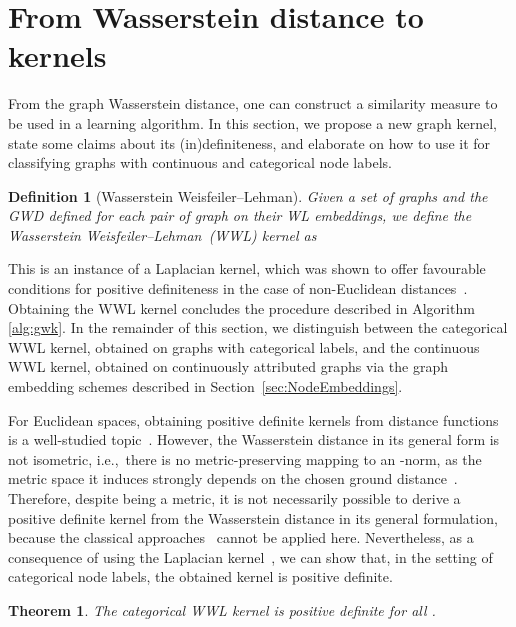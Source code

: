 \documentclass{article}
\newtheorem{definition}{Definition}
\newtheorem{theorem}{Theorem}
\begin{document}
\section{From Wasserstein distance to kernels}
\label{sec:kernels}



From the graph Wasserstein distance, one can construct a similarity measure to be used in a learning algorithm.
In this section, we propose a new graph kernel, state some claims about its (in)definiteness, and elaborate on how to use it for classifying graphs with continuous and categorical node labels.

\begin{definition}[Wasserstein Weisfeiler--Lehman]
\label{def:wwl}
Given a set of graphs   and the GWD defined for each pair of graph on their WL embeddings, we define the Wasserstein Weisfeiler--Lehman~(WWL) kernel as 

\end{definition}

This is an instance of a Laplacian kernel, which was shown to offer favourable conditions for positive definiteness in the case of non-Euclidean distances~\citep{feragen2015geodesic}. Obtaining the WWL kernel concludes the procedure described in Algorithm \ref{alg:gwk}. In the remainder of this section, we distinguish between the categorical WWL kernel, obtained on graphs with categorical labels, and the continuous WWL kernel, obtained on continuously attributed graphs via the graph embedding schemes described in Section~\ref{sec:NodeEmbeddings}.



For Euclidean spaces, obtaining positive definite kernels from distance functions is a well-studied topic~\citep{haasdonk2004learning}. 
However, the Wasserstein distance in its general form is not isometric, i.e.,\ there is no metric-preserving mapping to an -norm, as the metric space it induces strongly depends on the chosen ground distance~\citep{figalli2011optimal}.
Therefore, despite being a metric, it is not necessarily possible to derive a positive definite kernel from the Wasserstein distance in its general formulation, because the classical approaches~\citep{haasdonk2004learning} cannot be applied here.
Nevertheless, as a consequence of using the Laplacian kernel~\citep{feragen2015geodesic}, we can show that, in the setting of categorical node labels, the obtained kernel is positive definite.
\begin{theorem}
The categorical WWL kernel is positive definite for all .
\label{th:pd}
\end{theorem}
\end{document}
